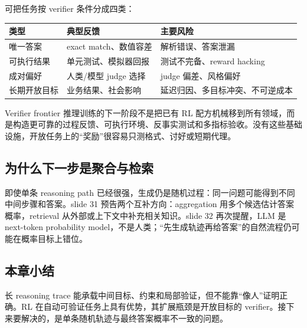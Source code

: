 可把任务按 verifier 条件分成四类：
\begin{center}
\begin{tabularx}{0.96\textwidth}{p{}X X}
\toprule
类型 & 典型反馈 & 主要风险 \\
\midrule
唯一答案 & exact match、数值容差 & 解析错误、答案泄漏 \\
可执行结果 & 单元测试、模拟器回报 & 测试不完备、reward hacking \\
成对偏好 & 人类/模型 judge 选择 & judge 偏差、风格偏好 \\
长期开放目标 & 业务结果、社会影响 & 延迟归因、多目标冲突、不可逆成本 \\
\bottomrule
\end{tabularx}
\end{center}

\begin{knowledgebox}{Verifier frontier}
推理训练的下一阶段不是把已有 RL 配方机械移到所有领域，而是构造更可靠的过程反馈、可执行环境、反事实测试和多指标验收。没有这些基础设施，开放任务上的“奖励”很容易只测格式、讨好或短期代理。
\end{knowledgebox}

\subsection{为什么下一步是聚合与检索}

即使单条 reasoning path 已经很强，生成仍是随机过程：同一问题可能得到不同中间步骤和答案。slide 31 预告两个互补方向：aggregation 用多个候选估计答案概率，retrieval 从外部或上下文中补充相关知识。slide 32 再次提醒，LLM 是 next-token probability model，不是人类；“先生成轨迹再给答案”的自然流程仍可能在概率目标上错位。




\subsection{本章小结}

长 reasoning trace 能承载中间目标、约束和局部验证，但不能靠“像人”证明正确。RL 在自动可验证任务上具有优势，其扩展瓶颈是开放目标的 verifier。接下来要解决的，是单条随机轨迹与最终答案概率不一致的问题。

